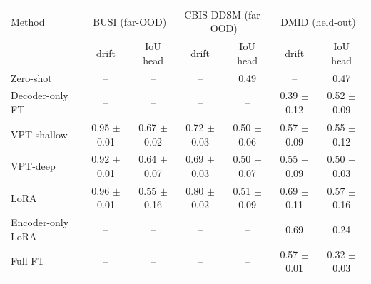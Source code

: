 \begin{tabular}{lcccccc}
\toprule
Method & \multicolumn{2}{c}{BUSI (far-OOD)} & \multicolumn{2}{c}{CBIS-DDSM (far-OOD)} & \multicolumn{2}{c}{DMID (held-out)} \\
 & drift & IoU head & drift & IoU head & drift & IoU head \\
\midrule
Zero-shot & -- & -- & -- & 0.49 & -- & 0.47 \\
Decoder-only FT & -- & -- & -- & -- & 0.39 $\pm$ 0.12 & 0.52 $\pm$ 0.09 \\
VPT-shallow & 0.95 $\pm$ 0.01 & 0.67 $\pm$ 0.02 & 0.72 $\pm$ 0.03 & 0.50 $\pm$ 0.06 & 0.57 $\pm$ 0.09 & 0.55 $\pm$ 0.12 \\
VPT-deep & 0.92 $\pm$ 0.01 & 0.64 $\pm$ 0.07 & 0.69 $\pm$ 0.03 & 0.50 $\pm$ 0.07 & 0.55 $\pm$ 0.09 & 0.50 $\pm$ 0.03 \\
LoRA & 0.96 $\pm$ 0.01 & 0.55 $\pm$ 0.16 & 0.80 $\pm$ 0.02 & 0.51 $\pm$ 0.09 & 0.69 $\pm$ 0.11 & 0.57 $\pm$ 0.16 \\
Encoder-only LoRA & -- & -- & -- & -- & 0.69 & 0.24 \\
Full FT & -- & -- & -- & -- & 0.57 $\pm$ 0.01 & 0.32 $\pm$ 0.03 \\
\bottomrule
\end{tabular}
